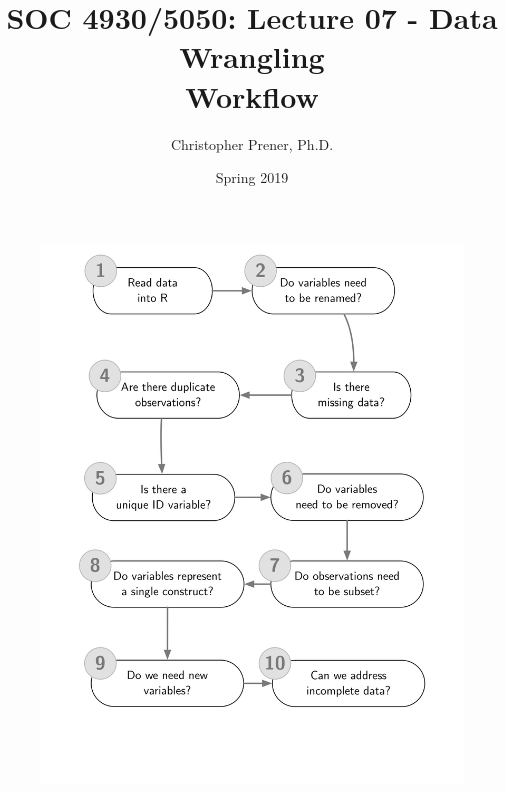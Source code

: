 \documentclass{tufte-handout}
\title{SOC 4930/5050: Lecture 07 - Data Wrangling \\Workflow}
\author{Christopher Prener, Ph.D.}
\date{Spring 2019}
\begin{document}
\maketitle %

\begin{fullwidth}
\begin{figure}[!h]
\includegraphics[scale=.70]{"wrangling"}
\end{figure}
\end{fullwidth}

\end{document}
